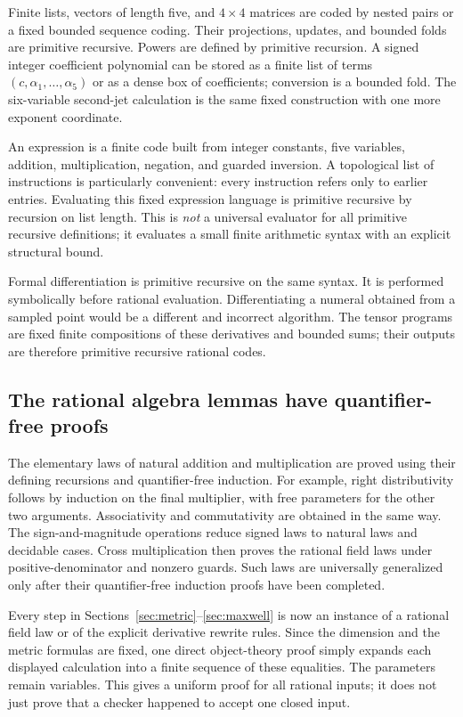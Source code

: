 \documentclass[11pt,a4paper]{article}
\numberwithin{equation}{section}
\theoremstyle{definition}\newtheorem{definition}[theorem]{Definition}
\theoremstyle{remark}\newtheorem{remark}[theorem]{Remark}
\begin{document}
Finite lists, vectors of length five, and $4\times4$ matrices are coded by nested pairs or a fixed bounded sequence coding. Their projections, updates, and bounded folds are primitive recursive. Powers are defined by primitive recursion. A signed integer coefficient polynomial can be stored as a finite list of terms $(c,\alpha_1,\ldots,\alpha_5)$ or as a dense box of coefficients; conversion is a bounded fold. The six-variable second-jet calculation is the same fixed construction with one more exponent coordinate.

An expression is a finite code built from integer constants, five variables, addition, multiplication, negation, and guarded inversion. A topological list of instructions is particularly convenient: every instruction refers only to earlier entries. Evaluating this fixed expression language is primitive recursive by recursion on list length. This is \emph{not} a universal evaluator for all primitive recursive definitions; it evaluates a small finite arithmetic syntax with an explicit structural bound.

Formal differentiation is primitive recursive on the same syntax. It is performed symbolically before rational evaluation. Differentiating a numeral obtained from a sampled point would be a different and incorrect algorithm. The tensor programs are fixed finite compositions of these derivatives and bounded sums; their outputs are therefore primitive recursive rational codes.

\subsection{The rational algebra lemmas have quantifier-free proofs}
The elementary laws of natural addition and multiplication are proved using their defining recursions and quantifier-free induction. For example, right distributivity follows by induction on the final multiplier, with free parameters for the other two arguments. Associativity and commutativity are obtained in the same way. The sign-and-magnitude operations reduce signed laws to natural laws and decidable cases. Cross multiplication then proves the rational field laws under positive-denominator and nonzero guards. Such laws are universally generalized only after their quantifier-free induction proofs have been completed.

Every step in Sections~\ref{sec:metric}--\ref{sec:maxwell} is now an instance of a rational field law or of the explicit derivative rewrite rules. Since the dimension and the metric formulas are fixed, one direct object-theory proof simply expands each displayed calculation into a finite sequence of these equalities. The parameters remain variables. This gives a uniform proof for all rational inputs; it does not just prove that a checker happened to accept one closed input.
\end{document}
